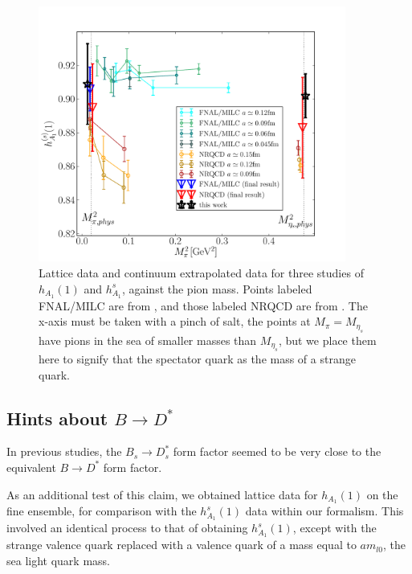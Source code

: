 \begin{figure}[htb!]
  \vspace{-20pt}
  \begin{center}
  \includegraphics[width=0.9\textwidth]{images/BsDsstar/fermilab_nrqcd_data.pdf}
  \caption{Lattice data and continuum extrapolated data for three studies of $h_{A_1}(1)$ and $h_{A_1}^s$, against the pion mass. Points labeled FNAL/MILC are from \cite{Bailey:2014tva}, and those labeled NRQCD are from \cite{Harrison:2017fmw}. The x-axis must be taken with a pinch of salt, the points at $M_{\pi}=M_{\eta_s}$ have pions in the sea of smaller masses than $M_{\eta_s}$, but we place them here to signify that the spectator quark as the mass of a strange quark. \label{fig:fermilab_data}}
  \end{center}
  \vspace{-20pt}
\end{figure}

\subsection{Hints about $B\to D^*$}

In previous studies, the $B_s\to D_s^*$ form factor seemed to be very close to the equivalent $B\to D^*$ form factor. 

As an additional test of this claim, we obtained lattice data for $h_{A_1}(1)$ on the fine ensemble, for comparison with the $h_{A_1}^s(1)$ data within our formalism. This involved an identical process to that of obtaining $h_{A_1}^s(1)$, except with the strange valence quark replaced with a valence quark of a mass equal to $am_{l0}$, the sea light quark mass.

